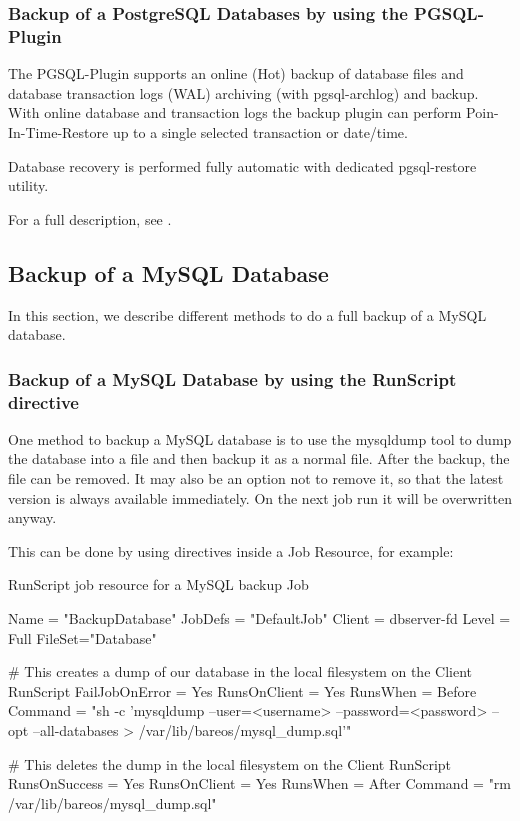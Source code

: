 \subsubsection{Backup of a PostgreSQL Databases by using the PGSQL-Plugin}
\label{backup-postgresql-plugin}

The PGSQL-Plugin supports an online (Hot) backup of database files and database transaction logs (WAL) archiving (with pgsql-archlog) and backup. With online database and transaction logs the backup plugin can perform Poin-In-Time-Restore up to a single selected transaction or date/time. 

Database recovery is performed fully automatic with dedicated pgsql-restore utility.

For a full description, see .



\subsection{Backup of a MySQL Database}
\label{backup-mysql}

In this section, we describe different methods to do a full backup of a MySQL database.

\subsubsection{Backup of a MySQL Database by using the RunScript directive}

One method to backup a MySQL database is to use the mysqldump tool to dump the database
into a file and then backup it as a normal file. After the backup, the file can be
removed. It may also be an option not to remove it, so that the latest version is
always available immediately. On the next job run it will be overwritten anyway.

This can be done by using  directives inside a
Job Resource, for example:
\begin{bconfig}{RunScript job resource for a MySQL backup}
Job {
  Name = "BackupDatabase"
  JobDefs = "DefaultJob"
  Client = dbserver-fd
  Level = Full
  FileSet="Database"

  # This creates a dump of our database in the local filesystem on the Client
  RunScript {
    FailJobOnError = Yes
    RunsOnClient = Yes
    RunsWhen = Before
    Command = "sh -c 'mysqldump --user=<username> --password=<password> --opt --all-databases > /var/lib/bareos/mysql_dump.sql'"
  }

  # This deletes the dump in the local filesystem on the Client
  RunScript {
    RunsOnSuccess = Yes
    RunsOnClient = Yes
    RunsWhen = After
    Command = "rm /var/lib/bareos/mysql_dump.sql"
  }
}
\end{bconfig}

